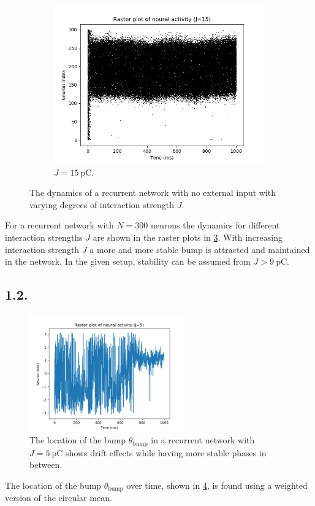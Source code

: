 \documentclass{article}
\begin{document}
\begin{figure}[h!]
\begin{subfigure}[b]{0.32\textwidth}
    \label{fig:J6}
  \end{subfigure}
  \hfill
  \begin{subfigure}[b]{0.32\textwidth}
    \includegraphics[width=\textwidth]{figures/1.1.raster_plot_J15.png}
    \caption{\(J=\qty{15}{\pico\coulomb}\).}
    \label{fig:J15}
  \end{subfigure}
  \caption{The dynamics of a recurrent network with no external input with varying degrees of interaction strength \(J\).}
  \label{fig:J}
\end{figure}

For a recurrent network with \(N=300\) neurons the dynamics for different interaction strengths \(J\) are shown in the raster plots in \cref{fig:J}. With increasing interaction strength \(J\) a more and more stable bump is attracted and maintained in the network. In the given setup, stability can be assumed from \(J>\qty{9}{\pico\coulomb}\).

\subsection*{1.2.}
\begin{figure}[h]
    \centering
    \includegraphics[width=0.6\textwidth]{figures/1.2.stability_plot_J5.png}
    \caption{The location of the bump \(\theta_\text{bump}\) in a recurrent network with \(J=\qty{5}{\pico\coulomb}\) shows drift effects while having more stable phases in between.}
    \label{fig:11}
\end{figure}
The location of the bump \(\theta_\text{bump}\) over time, shown in \cref{fig:11}, is found using a weighted version of the circular mean.
\end{document}

